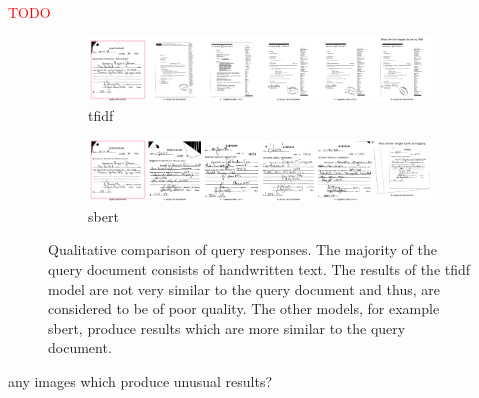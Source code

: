\textcolor{red}{TODO}
\begin{figure}[h!]
    \ContinuedFloat
    \begin{subfigure}{\textwidth}
        \centering
        \includegraphics[width=1\textwidth]{images/query_results/4542b223317eba23e4bda3e1536d61c8e2d2890a6439830ca8c62650bc1aac70/Most_similar_images_found_by_tfidf.pdf}
        \caption{\ac{tfidf}}
        \label{fig:bas_query_resp_tfidf}
    \end{subfigure}

    \begin{subfigure}{\textwidth}
        \centering
        \includegraphics[width=1\textwidth]{images/query_results/4542b223317eba23e4bda3e1536d61c8e2d2890a6439830ca8c62650bc1aac70/Most_similar_images_found_by_hugging.pdf}
        \caption{\ac{sbert}}
        \label{fig:good_query_resp_sbert}
    \end{subfigure}

\caption[Qualitative comparison of query responses]{Qualitative comparison of query responses.
The majority of the query document consists of handwritten text.
The results of the \ac{tfidf} model are not very similar to the query document and thus, are considered to be of poor quality.
The other models, for example \ac{sbert}, produce results which are more similar to the query document.
}
\label{fig:comp_query_resp}
\end{figure}



any images which produce unusual results?